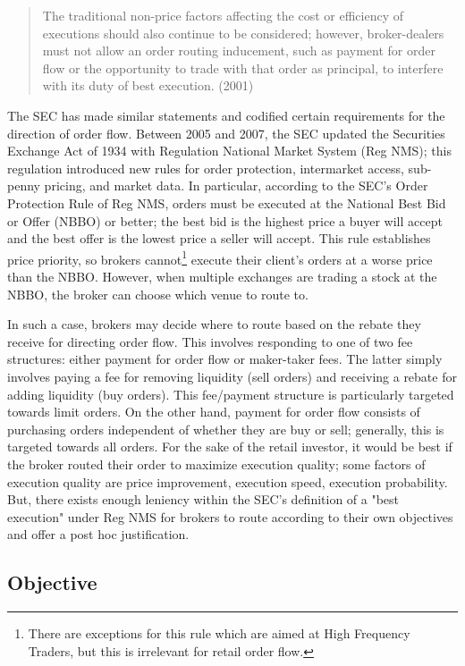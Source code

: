 \documentclass[12pt,a4paper]{article}
\begin{document}
	
	\begin{quote}
		The traditional non-price factors affecting the cost or efficiency of executions should also continue to be considered; however, broker-dealers must not allow an order routing inducement, such as payment for order flow or the opportunity to trade with that order as principal, to interfere with its duty of best execution. (2001)
	\end{quote}
	The SEC has made similar statements and codified certain requirements for the direction of order flow. Between 2005 and 2007, the SEC updated the Securities Exchange Act of 1934 with Regulation National Market System (Reg NMS); this regulation introduced new rules for order protection, intermarket access, sub-penny pricing, and market data. In particular, according to the SEC's Order Protection Rule of Reg NMS, orders must be executed at the National Best Bid or Offer (NBBO) or better; the best bid is the highest price a buyer will accept and the best offer is the lowest price a seller will accept. This rule establishes price priority, so brokers cannot\footnote{ There are exceptions for this rule which are aimed at High Frequency Traders, but this is irrelevant for retail order flow.} execute their client's orders at a worse price than the NBBO. However, when multiple exchanges are trading a stock at the NBBO, the broker can choose which venue to route to. 
	
	In such a case, brokers may decide where to route based on the rebate they receive for directing order flow. This involves responding to one of two fee structures: either payment for order flow or maker-taker fees. The latter simply involves paying a fee for removing liquidity (sell orders) and receiving a rebate for adding liquidity (buy orders). This fee/payment structure is particularly targeted towards limit orders. On the other hand, payment for order flow consists of purchasing orders independent of whether they are buy or sell; generally, this is targeted towards all orders. For the sake of the retail investor, it would be best if the broker routed their order to maximize execution quality; some factors of execution quality are price improvement, execution speed, execution probability. But, there exists enough leniency within the SEC's definition of a "best execution" under Reg NMS for brokers to route according to their own objectives and offer a post hoc justification. 
	
	\subsection{Objective}
	
\end{document}
